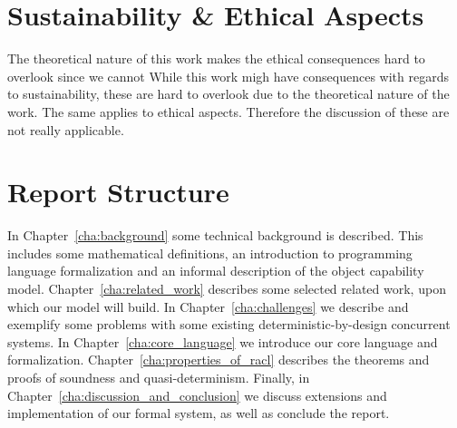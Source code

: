 \section{Sustainability \& Ethical Aspects}%
\label{sec:sustainability_&_ethical_aspects}


%
The theoretical nature of this work makes the ethical consequences hard to
overlook since we cannot 
While this work migh have consequences with regards to sustainability, these are
hard to overlook due to the theoretical nature of the work. The same applies to
ethical aspects. Therefore the discussion of these are not really applicable.

\section{Report Structure}%
\label{sec:report_structure}

In Chapter~\ref{cha:background} some technical background is described. This
includes some mathematical definitions, an introduction to programming language
formalization and an informal description of the object capability
model. Chapter~\ref{cha:related_work} describes some selected related work, upon
which our model will build. In Chapter~\ref{cha:challenges} we describe and
exemplify some problems with some existing deterministic-by-design concurrent
systems. In Chapter~\ref{cha:core_language} we introduce our core language and
formalization. Chapter~\ref{cha:properties_of_racl} describes the theorems and
proofs of soundness and quasi-determinism. Finally, in
Chapter~\ref{cha:discussion_and_conclusion} we discuss extensions and
implementation of our formal system, as well as conclude the report.



